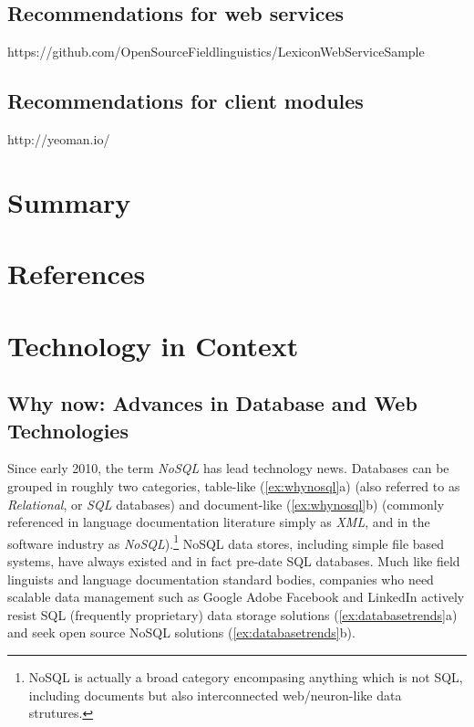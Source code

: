 \documentclass[12pt]{article}
\begin{document}
\subsection{Recommendations for web services}

https://github.com/OpenSourceFieldlinguistics/LexiconWebServiceSample

\subsection{Recommendations for client modules}

http://yeoman.io/

\section{Summary}
\section*{References}

%


\appendix
\section{Technology in Context}

\subsection{Why now: Advances in Database and Web Technologies}
\label{appendix:technology}

Since early 2010, the term \emph{NoSQL} has lead technology news. Databases can be grouped in roughly two categories, table-like (\ref{ex:whynosql}a) (also referred to as \emph{Relational}, or \emph{SQL} databases) and document-like (\ref{ex:whynosql}b) (commonly referenced in language documentation literature  simply as \emph{XML}, and in the software industry as \emph{NoSQL}).\footnote{NoSQL is actually a broad category encompasing anything which is not SQL, including documents but also interconnected web/neuron-like data strutures.} NoSQL data stores, including simple file based systems, have always existed and in fact pre-date SQL databases. Much like field linguists and language documentation standard bodies, companies who need  scalable data management such as Google \citep{Dean:2004, Dean:2008}  Adobe \citep{Lehene:2010:Online} Facebook \citep{Borthakur:2011}  and LinkedIn \citep{Sumbaly:2013} actively resist SQL (frequently proprietary) data storage solutions  (\ref{ex:databasetrends}a) and seek open source NoSQL solutions (\ref{ex:databasetrends}b). 
\end{document}
